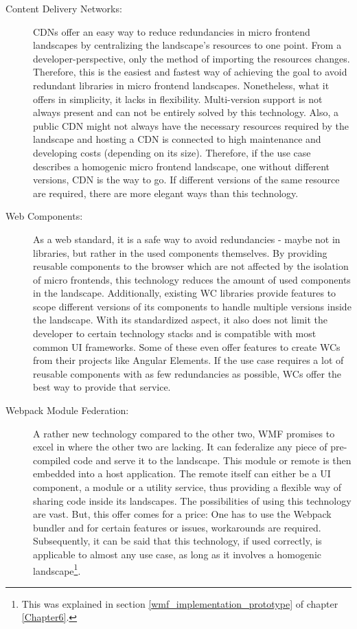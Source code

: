 \begin{description}
	\item[Content Delivery Networks:] CDNs offer an easy way to reduce redundancies in micro frontend landscapes by centralizing the landscape's resources to one point. 
	From a developer-perspective, only the method of importing the resources changes. 
	Therefore, this is the easiest and fastest way of achieving the goal to avoid redundant libraries in micro frontend landscapes. 
	Nonetheless, what it offers in simplicity, it lacks in flexibility. 
	Multi-version support is not always present and can not be entirely solved by this technology. 
	Also, a public CDN might not always have the necessary resources required by the landscape and hosting a CDN is connected to high maintenance and developing costs (depending on its size). 
	Therefore, if the use case describes a homogenic micro frontend landscape, one without different versions, CDN is the way to go. 
	If different versions of the same resource are required, there are more elegant ways than this technology.
	
	\item[Web Components:] As a web standard, it is a safe way to avoid redundancies - maybe not in libraries, but rather in the used components themselves. 
	By providing reusable components to the browser which are not affected by the isolation of micro frontends, this technology reduces the amount of used components in the landscape. 
	Additionally, existing WC libraries provide features to scope different versions of its components to handle multiple versions inside the landscape. 
	With its standardized aspect, it also does not limit the developer to certain technology stacks and is compatible with most common UI frameworks. 
	Some of these even offer features to create WCs from their projects like Angular Elements. 
	If the use case requires a lot of reusable components with as few redundancies as possible, WCs offer the best way to provide that service.
	
	\item[Webpack Module Federation:] A rather new technology compared to the other two, WMF promises to excel in where the other two are lacking. 
	It can federalize any piece of pre-compiled code and serve it to the landscape. 
	This module or remote is then embedded into a host application. 
	The remote itself can either be a UI component, a module or a utility service, thus providing a flexible way of sharing code inside its landscapes. 
	The possibilities of using this technology are vast. 
	But, this offer comes for a price: One has to use the Webpack bundler and for certain features or issues, workarounds are required. 
	Subsequently, it can be said that this technology, if used correctly, is applicable to almost any use case, as long as it involves a homogenic landscape\footnote{This was explained in section \ref{wmf_implementation_prototype} of chapter \ref{Chapter6}.}.
\end{description}

